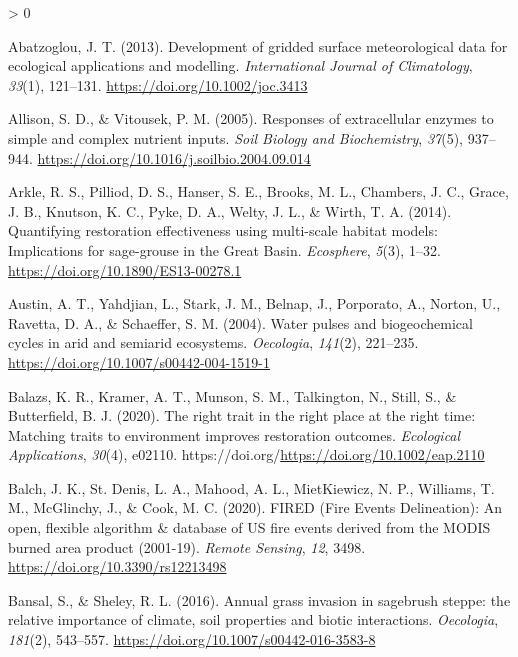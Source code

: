 \documentclass[
  11pt,
  a4paper,
]{article}
\newlength{\cslhangindent}
\newenvironment{CSLReferences}[2] %
 {%
  \setlength{\parindent}{0pt}
  \ifodd #1 \everypar{\setlength{\hangindent}{\cslhangindent}}\ignorespaces\fi
  \ifnum #2 > 0
  \setlength{\parskip}{#2\baselineskip}
  \fi
 }%
 {}
\begin{document}
\hypertarget{refs}{}
\begin{CSLReferences}{1}{0}
\leavevmode\hypertarget{ref-Abatzoglou2013}{}%
Abatzoglou, J. T. (2013). {Development of gridded surface meteorological data for ecological applications and modelling}. \emph{International Journal of Climatology}, \emph{33}(1), 121--131. \url{https://doi.org/10.1002/joc.3413}

\leavevmode\hypertarget{ref-Allison2005}{}%
Allison, S. D., \& Vitousek, P. M. (2005). {Responses of extracellular enzymes to simple and complex nutrient inputs}. \emph{Soil Biology and Biochemistry}, \emph{37}(5), 937--944. \url{https://doi.org/10.1016/j.soilbio.2004.09.014}

\leavevmode\hypertarget{ref-Arkle2014}{}%
Arkle, R. S., Pilliod, D. S., Hanser, S. E., Brooks, M. L., Chambers, J. C., Grace, J. B., Knutson, K. C., Pyke, D. A., Welty, J. L., \& Wirth, T. A. (2014). Quantifying restoration effectiveness using multi-scale habitat models: {Implications} for sage-grouse in the {Great} {Basin}. \emph{Ecosphere}, \emph{5}(3), 1--32. \url{https://doi.org/10.1890/ES13-00278.1}

\leavevmode\hypertarget{ref-Austin2004}{}%
Austin, A. T., Yahdjian, L., Stark, J. M., Belnap, J., Porporato, A., Norton, U., Ravetta, D. A., \& Schaeffer, S. M. (2004). {Water pulses and biogeochemical cycles in arid and semiarid ecosystems}. \emph{Oecologia}, \emph{141}(2), 221--235. \url{https://doi.org/10.1007/s00442-004-1519-1}

\leavevmode\hypertarget{ref-Balazs2020}{}%
Balazs, K. R., Kramer, A. T., Munson, S. M., Talkington, N., Still, S., \& Butterfield, B. J. (2020). The right trait in the right place at the right time: {Matching} traits to environment improves restoration outcomes. \emph{Ecological Applications}, \emph{30}(4), e02110. https://doi.org/\url{https://doi.org/10.1002/eap.2110}

\leavevmode\hypertarget{ref-Balch2020fired}{}%
Balch, J. K., St. Denis, L. A., Mahood, A. L., MietKiewicz, N. P., Williams, T. M., McGlinchy, J., \& Cook, M. C. (2020). {FIRED (Fire Events Delineation): An open, flexible algorithm \& database of US fire events derived from the MODIS burned area product (2001-19)}. \emph{Remote Sensing}, \emph{12}, 3498. \url{https://doi.org/10.3390/rs12213498}

\leavevmode\hypertarget{ref-Bansal2016}{}%
Bansal, S., \& Sheley, R. L. (2016). {Annual grass invasion in sagebrush steppe: the relative importance of climate, soil properties and biotic interactions}. \emph{Oecologia}, \emph{181}(2), 543--557. \url{https://doi.org/10.1007/s00442-016-3583-8}


\end{CSLReferences}
\end{document}
